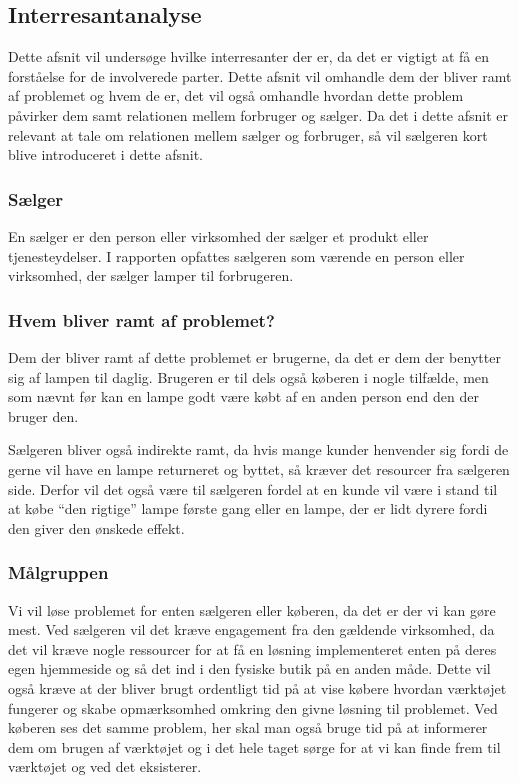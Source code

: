 \subsection{Interresantanalyse}

 Dette afsnit vil undersøge hvilke interresanter der er, da det er vigtigt at få en forståelse for de involverede parter. Dette afsnit vil omhandle dem der bliver ramt af problemet og hvem de er, det vil også omhandle hvordan dette problem påvirker dem samt relationen mellem forbruger og sælger. Da det i dette afsnit er relevant at tale om relationen mellem sælger og forbruger, så vil sælgeren kort blive introduceret i dette afsnit.

 \subsubsection{Sælger}
En sælger er den person eller virksomhed der sælger et produkt eller tjenesteydelser. I rapporten opfattes sælgeren som værende en person eller virksomhed, der sælger lamper til forbrugeren. 

\subsubsection{Hvem bliver ramt af problemet?}
Dem der bliver ramt af dette problemet er brugerne, da det er dem der benytter sig af lampen til daglig. Brugeren er til dels også køberen i nogle tilfælde, men som nævnt før kan en lampe godt være købt af en anden person end den der bruger den.

Sælgeren bliver også indirekte ramt, da hvis mange kunder henvender sig fordi de gerne vil have en lampe returneret og byttet, så kræver det resourcer fra sælgeren side. Derfor vil det også være til sælgeren fordel at en kunde vil være i stand til at købe “den rigtige” lampe første gang eller en lampe, der er lidt dyrere fordi den giver den ønskede effekt.
 
\subsubsection{Målgruppen}
Vi vil løse problemet for enten sælgeren eller køberen, da det er der vi kan gøre mest. Ved sælgeren vil det kræve engagement fra den gældende virksomhed, da det vil kræve nogle ressourcer for at få en løsning implementeret enten på deres egen hjemmeside og så det ind i den fysiske butik på en anden måde. Dette vil også kræve at der bliver brugt ordentligt tid på at vise købere hvordan værktøjet fungerer og skabe opmærksomhed omkring den givne løsning til problemet.
Ved køberen ses det samme problem, her skal man også bruge tid på at informerer dem om brugen af værktøjet og i det hele taget sørge for at vi kan finde frem til værktøjet og ved det eksisterer.
 
